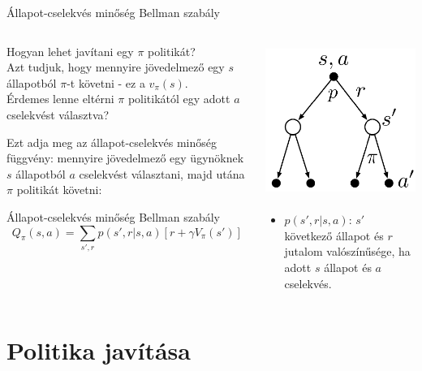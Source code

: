 \documentclass[english, aspectratio=169]{beamer}
\makeatletter
\let\origtableofcontents=\tableofcontents
\def\tableofcontents{\@ifnextchar[{\origtableofcontents}{\gobbletableofcontents}}
\def\gobbletableofcontents#1{\origtableofcontents}
\makeatother
\begin{document}
\begin{frame}{Állapot-cselekvés minőség Bellman szabály}
\begin{columns}
\begin{column}{.6\textwidth}
Hogyan lehet javítani egy $\pi$ politikát?\\
Azt tudjuk, hogy mennyire jövedelmező egy $s$ állapotból $\pi$-t követni - ez a $v_\pi(s)$.\\ Érdemes lenne eltérni $\pi$ politikától egy adott $a$ cselekvést választva?\par\smallskip
Ezt adja meg az állapot-cselekvés minőség függvény: mennyire jövedelmező egy ügynöknek $s$ állapotból $a$ cselekvést választani, majd utána $\pi$ politikát követni:\\
\begin{block}{Állapot-cselekvés minőség Bellman szabály}
\[
Q_{\pi}(s,a)=\sum_{s',r}p\left(s',r|s,a\right)\left[r + \gamma V_{\pi}\left(s'\right)\right]
\]
\end{block}
\end{column}
\begin{column}{.45\textwidth}
\begin{center}
\includegraphics[width=5cm, height=5cm, keepaspectratio]{images/reinf_12.png}
\end{center}
\begin{itemize}
	\item $p\left(s',r|s,a\right)$: $s'$ következő állapot és $r$ jutalom valószínűsége, ha adott $s$ állapot és $a$ cselekvés.
\end{itemize}
\end{column}
\end{columns}
\end{frame}

\section{Politika javítása}

\begin{frame}
\tableofcontents[currentsection]
\end{frame}
\end{document}
